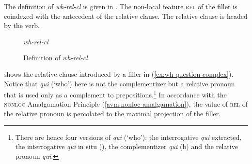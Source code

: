 The definition of \textit{wh-rel-cl} is given in . The non-local feature \textsc{rel} of the filler is coindexed with the antecedent of the relative clause. The relative clause is headed by the verb. 

\begin{figure}[ht]
\textit{wh-rel-cl} 
\caption{Definition of \textit{wh-rel-cl}}
\label{avm:wh-rel-cl}
\end{figure}

 shows the relative clause introduced by a filler in (\ref{ex:wh-question-complex}). Notice that \emph{qui} (`who') here is not the complementizer but a relative pronoun that is used only as a complement to prepositions.\footnote{There are hence four versions of \emph{qui} (`who'): the interrogative \emph{qui} extracted, the interrogative \emph{qui} in situ (), the complementizer \emph{qui} (b) and the relative pronoun \emph{qui}.} In accordance with the \textsc{nonloc} Amalgamation Principle (\ref{avm:nonloc-amalgamation}), the value of \textsc{rel} of the relative pronoun is percolated to the maximal projection of the filler.

\label{ex:rc-complex}
\z

